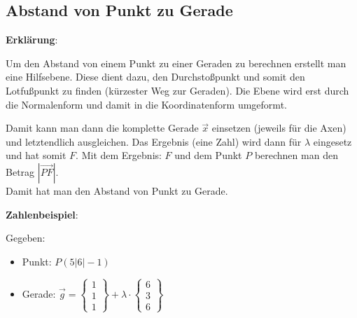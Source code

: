 \subsection{Abstand von Punkt zu Gerade}
\textbf{Erklärung}: 

Um den Abstand von einem Punkt zu einer Geraden zu berechnen erstellt man eine Hilfsebene.
Diese dient dazu, den Durchstoßpunkt und somit den Lotfußpunkt zu finden (kürzester Weg zur Geraden). 
Die Ebene wird erst durch die Normalenform und damit in die Koordinatenform umgeformt. 

Damit kann man dann die komplette Gerade $\vec{x}$ einsetzen 
(jeweils für die Axen) und letztendlich ausgleichen. 
Das Ergebnis (eine Zahl) wird dann für $\lambda$ eingesetz und hat somit $F$.
Mit dem Ergebnis: $F$ und dem Punkt $P$ berechnen man den Betrag $|\overrightarrow{PF}|$. \\
Damit hat man den Abstand von Punkt zu Gerade.

\textbf{Zahlenbeispiel}: 

Gegeben: 
\begin{itemize}
    \item Punkt: $P(5|6|-1)$
    \item Gerade: $
        \vec{g} = 
        \begin{Bmatrix}
            1 \\ 1 \\ 1
        \end{Bmatrix}
        + \lambda \cdot
        \begin{Bmatrix}
            6 \\ 3 \\ 6
        \end{Bmatrix}
        $
\end{itemize}

